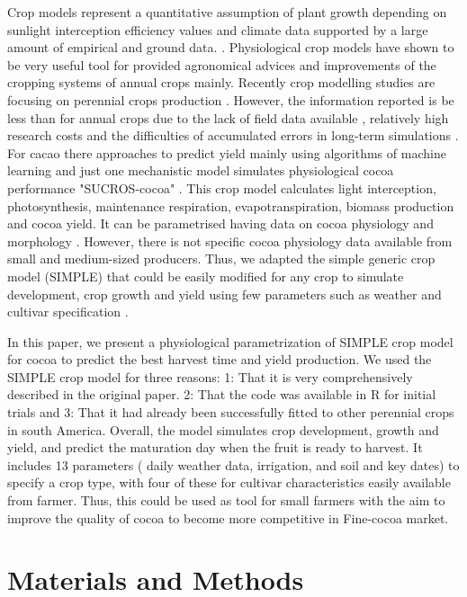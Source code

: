 \documentclass[gene,journal,article,submit,moreauthors,pdftex]{Definitions/mdpi}
\begin{document}
Crop models represent a quantitative assumption of plant growth depending on sunlight interception efficiency values and climate data supported by a large amount of empirical and ground data. \citep{Reynolds2018}. Physiological crop models have shown to be very useful tool for provided agronomical advices and improvements of the cropping systems of annual crops mainly. Recently crop modelling studies are focusing on  perennial crops  production \citep{zuidema2005, Zao2019simple, Bai2020, Romero2021}. However, the information reported  is be less than for annual crops due to the lack of field data available , relatively high research costs and the difficulties of accumulated errors in long-term simulations \citep{zuidema2005}. For cacao there  approaches  to predict yield mainly  using algorithms of machine learning \citep{lamos2020} and just one mechanistic model simulates physiological cocoa performance  "SUCROS-cocoa" \citep{zuidema2005}. This crop model calculates light interception, photosynthesis, maintenance respiration,
evapotranspiration, biomass production and cocoa yield. It can be parametrised having data on cocoa physiology and morphology \citep{zuidema2005}. However,  there is not specific cocoa physiology data available from small and medium-sized producers. Thus, we adapted the simple generic crop model (SIMPLE) that could be easily modified for any crop to simulate development, crop growth and yield using few parameters such as weather and cultivar specification \citep{Zao2019simple}.

In this paper, we present a physiological parametrization of SIMPLE crop model for cocoa to predict the best harvest time  and yield production. We used the SIMPLE crop model \citep{Zao2019simple} for three reasons: 1: That it is very comprehensively described in the original paper. 2: That the code was available in R for initial trials and 3: That it had already been successfully fitted to other perennial crops in south America. Overall, the model simulates crop development, growth and yield, and predict the maturation day when the fruit is ready to harvest. It includes 13 parameters ( daily weather data, irrigation, and soil and key dates) to specify a crop type, with four of these for cultivar characteristics easily available from farmer. Thus, this could be used as  tool for small farmers with the aim to improve the quality of cocoa to become more competitive in Fine-cocoa market.

\section{Materials and Methods}
\end{document}
